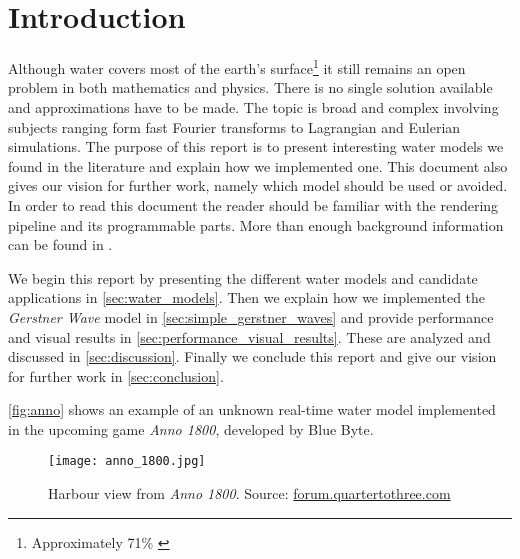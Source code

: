 \section{Introduction}


Although water covers most of the earth's surface\footnote{Approximately 71\%
\autocite{howard2016how}} it still remains an open problem in both mathematics
and physics. There is no single solution available and approximations have to be
made. The topic is broad and complex involving subjects ranging form fast
Fourier transforms to Lagrangian and Eulerian simulations. The purpose of this
report is to present interesting water models we found in the literature and
explain how we implemented one. This document also gives our vision for further
work, namely which model should be used or avoided. In order to read this
document the reader should be familiar with the rendering pipeline and its
programmable parts. More than enough background information can be found in
\autocite{RTR3}.

We begin this report by presenting the different water models and candidate
applications in \autoref{sec:water_models}. Then we explain how we implemented
the \textit{Gerstner Wave} model in \autoref{sec:simple_gerstner_waves} and
provide performance and visual results in
\autoref{sec:performance_visual_results}. These are analyzed and discussed in
\autoref{sec:discussion}. Finally we conclude this report and give our vision
for further work in \autoref{sec:conclusion}.

\autoref{fig:anno} shows an example of an unknown real-time water model
implemented in the upcoming game \textit{Anno 1800}, developed by Blue Byte.

\begin{figure}[ht]
    \centering
    \texttt{[image: anno\_1800.jpg]}
    \caption{Harbour view from \textit{Anno 1800}. Source:
    \href{https://forum.quartertothree.com/t/anno-1800-city-building-in-the-industrial-revolution/131265/12}{\url{forum.quartertothree.com}}}\label{fig:anno}
\end{figure}
